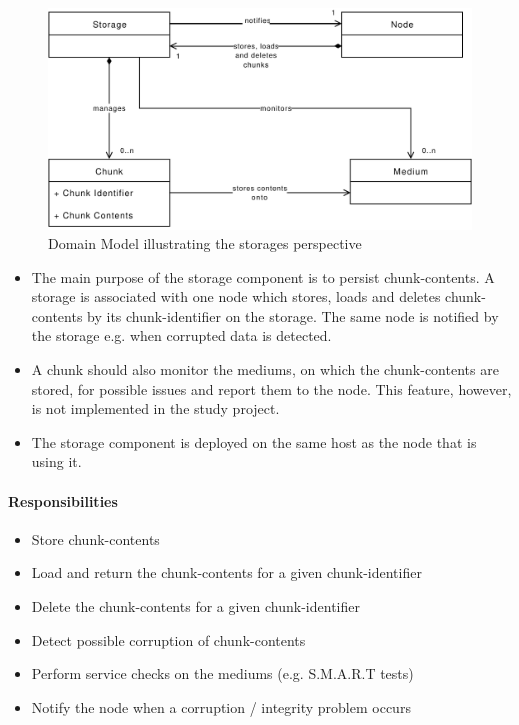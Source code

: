 \begin{figure}[h]
    \centering
    \includegraphics[width=1\linewidth]{resources/storage_domain_model}
    \caption[Storage Domain Model]{Domain Model illustrating the \gls{storage}s perspective}
\end{figure}

\begin{itemize}
    \item The main purpose of the \gls{storage} component is to persist \glspl{chunk-content}. A \gls{storage} is associated with one \gls{node} which stores, loads and deletes \glspl{chunk-content} by its \gls{chunk-identifier} on the \gls{storage}. The same \gls{node} is notified by the \gls{storage} e.g. when corrupted data is detected.
    \item A \gls{chunk} should also monitor the \glspl{medium}, on which the \glspl{chunk-content} are stored, for possible issues and report them to the \gls{node}. This feature, however, is not implemented in the study project.
    \item The \gls{storage} component is deployed on the same host as the \gls{node} that is using it.
\end{itemize}


\paragraph{Responsibilities}

\begin{itemize}
    \item Store \glspl{chunk-content}
    \item Load and return the \glspl{chunk-content} for a given \gls{chunk-identifier}
    \item Delete the \glspl{chunk-content} for a given \gls{chunk-identifier}
    \item Detect possible corruption of \glspl{chunk-content}
    \item Perform service checks on the \glspl{medium} (e.g. S.M.A.R.T tests)
    \item Notify the \gls{node} when a corruption / integrity problem occurs
\end{itemize}

